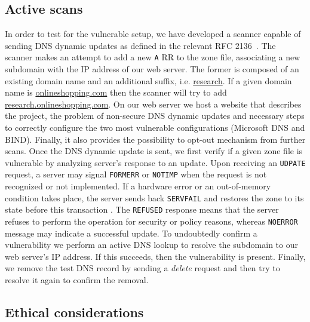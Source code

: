 \subsection{Active scans}

In order to test for the vulnerable setup, we have developed a scanner capable of sending DNS dynamic updates as defined in the relevant RFC 2136~\cite{rfc2136}.
The scanner makes an attempt to add a new \texttt{A} RR to the zone file, associating a new subdomain with the IP address of our web server.
The former is composed of an existing domain name and an additional suffix, i.e. \url{research}.
If a given domain name is \url{onlineshopping.com} then the scanner will try to add \url{research.onlineshopping.com}.
On our web server we host a website that describes the project, the problem of non-secure DNS dynamic updates and necessary steps to correctly configure the two most vulnerable configurations (Microsoft DNS and BIND). 
Finally, it also provides the possibility to opt-out mechanism from further scans. 
%
Once the DNS dynamic update is sent, we first verify if a given zone file is vulnerable by analyzing server's response to an update.
Upon receiving an \texttt{UDPATE} request, a server may signal \texttt{FORMERR} or \texttt{NOTIMP} when the request is not recognized or not implemented. 
If a hardware error or an out-of-memory condition takes place, the server sends back \texttt{SERVFAIL} and restores the zone to its state before this transaction \cite{rfc2136}.
The \texttt{REFUSED} response means that the server refuses to perform the operation for security or policy reasons, whereas \texttt{NOERROR} message may indicate a successful update.
To undoubtedly confirm a vulnerability we perform an active DNS lookup to resolve the subdomain to our web server’s IP address. 
If this succeeds, then the vulnerability is present. 
Finally, we remove the test DNS record by sending a \textit{delete} request and then try to resolve it again to confirm the removal.

\subsection{Ethical considerations}
